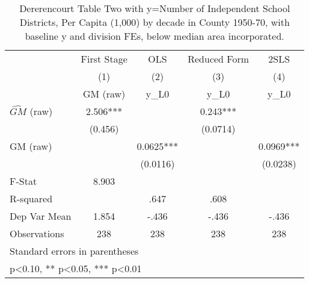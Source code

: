 \begin{table}[htbp]\centering
\def\sym#1{\ifmmode^{#1}\else\(^{#1}\)\fi}
\caption{Dererencourt Table Two with y=Number of Independent School Districts, Per Capita (1,000) by decade in County 1950-70, with baseline y and division FEs, below median area incorporated.}
\begin{tabular}{l*{4}{c}}
\toprule
                    & First Stage   &         OLS   &Reduced Form   &        2SLS   \\
                    &\multicolumn{1}{c}{(1)}&\multicolumn{1}{c}{(2)}&\multicolumn{1}{c}{(3)}&\multicolumn{1}{c}{(4)}\\
                    &\multicolumn{1}{c}{GM  (raw)}&\multicolumn{1}{c}{y\_L0}&\multicolumn{1}{c}{y\_L0}&\multicolumn{1}{c}{y\_L0}\\
\midrule
$\hat{GM}$ (raw)    &       2.506***&               &       0.243***&               \\
                    &     (0.456)   &               &    (0.0714)   &               \\
\addlinespace
GM  (raw)           &               &      0.0625***&               &      0.0969***\\
                    &               &    (0.0116)   &               &    (0.0238)   \\
\midrule
F-Stat              &       8.903   &               &               &               \\
R-squared           &               &        .647   &        .608   &               \\
Dep Var Mean        &       1.854   &       -.436   &       -.436   &       -.436   \\
Observations        &         238   &         238   &         238   &         238   \\
\bottomrule
\multicolumn{5}{l}{\footnotesize Standard errors in parentheses}\\
\multicolumn{5}{l}{\footnotesize * p<0.10, ** p<0.05, *** p<0.01}\\
\end{tabular}
\end{table}
